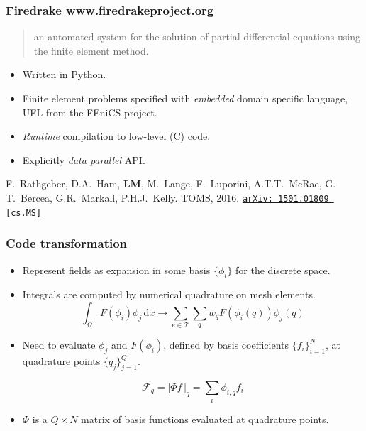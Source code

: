 \documentclass[presentation]{beamer}
\newcommand{\arxivlink}[2]{%
  \href{http://www.arxiv.org/abs/#1}%
  {\texttt{arXiv:\,#1\,[#2]}}%
}
\begin{document}
\begin{frame}
  \frametitle{Firedrake \url{www.firedrakeproject.org}}

  \begin{quote}
    {\normalfont [\ldots]} an automated system for the solution of partial
    differential equations using the finite element method.
  \end{quote}

  \begin{itemize}
  \item Written in Python.
  \item Finite element problems specified with \emph{embedded} domain
    specific language, UFL \parencite{Alnaes:2014} from the FEniCS project.
  \item \emph{Runtime} compilation to low-level (C) code.
  \item Explicitly \emph{data parallel} API.
  \end{itemize}

  \begin{flushright}
    {\scriptsize F.~Rathgeber, D.A.~Ham, \textbf{LM}, M.~Lange,
      F.~Luporini, A.T.T.~McRae, G.-T.~Bercea, G.R.~Markall,
      P.H.J.~Kelly. TOMS,
      2016. \arxivlink{1501.01809}{cs.MS}\nocite{Rathgeber:2016}}
  \end{flushright}
\end{frame}


\begin{frame}
  \frametitle{Code transformation}
  \begin{itemize}
  \item Represent fields as expansion in some basis $\{\phi_i\}$ for
    the discrete space.
  \item Integrals are computed by numerical quadrature on mesh elements.
    \begin{equation*}
      \int_\Omega F(\phi_i) \phi_j \,\text{d}x \rightarrow \sum_{e \in
        \mathcal{T}} \sum_q w_q F(\phi_i(q)) \phi_j(q)
    \end{equation*}
    \item Need to evaluate $\phi_j$ and $F(\phi_i)$, defined by basis coefficients
      $\{f_i\}_{i=1}^{N}$, at quadrature points $\{q_j\}_{j=1}^{Q}$.

    \begin{equation*}
      \mathcal{F}_q = \big[\Phi f\,\big]_q = \sum_i \phi_{i,q} f_i
    \end{equation*}
  \item $\Phi$ is a $Q\times N$ matrix of basis functions evaluated at
    quadrature points.
  \end{itemize}
\end{frame}
\end{document}
